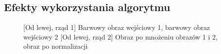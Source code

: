 \documentclass[a4paper,12pt, titlepage]{report}
\begin{document}
\subsection*{Efekty wykorzystania algorytmu}
\begin{figure}[h]
    \centering
    \qquad
    \caption{[Od lewej, rząd 1] Barwowy obraz wejściowy 1, barwowy obraz wejściowy 2 [Od lewej, rząd 2] Obraz po mnożeniu obrazów 1 i 2, obraz po normalizacji}%
    \label{fig:rysunek}%
\end{figure}
\FloatBarrier
\end{document}
